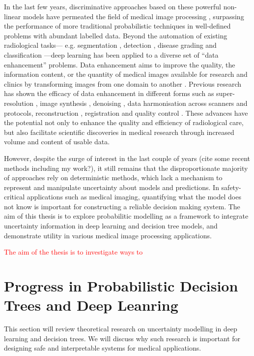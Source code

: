 In the last few years, discriminative approaches based on these powerful non-linear models have permeated the field of medical image processing \cite{criminisi2013decision,shen2017deep,litjens2017survey}, surpassing the performance of more traditional probabilistic techniques in well-defined problems with abundant labelled data. Beyond the automation of existing radiological tasks--- e.g. segmentation \cite{kamnitsas2017efficient}, detection \cite{roth2014new}, disease grading and classification \cite{araujo2017classification}---deep learning has been applied to a diverse set of ``data enhancement'' problems. Data enhancement aims to improve the quality, the information content, or the quantity of medical images available for research and clinics by transforming images from one domain to another \cite{isola2017image}. Previous research has shown the efficacy of data enhancement in different forms such as super-resolution \cite{oktay2016multi,chen2018efficient,ravi2019adversarial}, image synthesis \cite{nie2016estimating,kang2017deep}, denoising \cite{benou2017ensemble,chen2017low}, data harmonisation \cite{karayumak2018harmonizing,tax2019cross} across scanners and protocols, reconstruction \cite{sun2016deep,jin2017deep,hammernik2018learning,schlemper2018deep,zhu2018image,yang2018dagan,yoon2019efficient}, registration \cite{sokooti2017nonrigid,balakrishnan2018unsupervised} and quality control \cite{wu2017fuiqa,esses2018automated}.  These advances have the potential not only to enhance the quality and efficiency of radiological care, but also facilitate scientific discoveries in medical research through increased volume and content of usable data. 

However, despite the surge of interest in the last couple of years (cite some recent methods including my work?),  it still remains that the disproportionate majority of approaches rely on deterministic methods, which lack a mechanism to represent and manipulate uncertainty about models and predictions. In safety-critical applications such as medical imaging, quantifying what the model does not know is important for constructing a reliable decision making system. The aim of this thesis is to explore probabilitic modelling as a framework to integrate uncertainty information in deep learning and decision tree models, and demonstrate utility in various medical image processing applications. 

\textcolor{red}{The aim of the thesis is to investigate ways to } 

 
\section{Progress in Probabilistic Decision Trees and Deep Leanring}
This section will review theoretical research on uncertainty modelling in deep learning and decision trees. We will discuss why such research is important for designing safe and interpretable systems for medical applications. 


